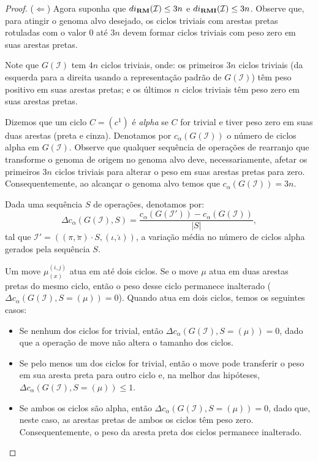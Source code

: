 \begin{proof}
($\Leftarrow$) Agora suponha que $di_{\textbf{RM}}(\mathcal{I}) \le 3n$ e $di_{\textbf{RMI}}(\mathcal{I}) \le 3n$. Observe que, para atingir o genoma alvo desejado, os ciclos triviais com arestas pretas rotuladas com o valor $0$ até $3n$ devem formar ciclos triviais com peso zero em suas arestas pretas.

Note que $G(\mathcal{I})$ tem $4n$ ciclos triviais, onde: os primeiros $3n$ ciclos triviais (da esquerda para a direita usando a representação padrão de $G(\mathcal{I})$) têm peso positivo em suas arestas pretas; e os últimos $n$ ciclos triviais têm peso zero em suas arestas pretas.

Dizemos que um ciclo $C=(c^1)$ é \emph{alpha} se $C$ for trivial e tiver peso zero em suas duas arestas (preta e cinza). Denotamos por $c_{\alpha}(G(\mathcal{I}))$ o número de ciclos alpha em $G(\mathcal{I})$. Observe que qualquer sequência de operações de rearranjo que transforme o genoma de origem no genoma alvo deve, necessariamente, afetar os primeiros $3n$ ciclos triviais para alterar o peso em suas arestas pretas para zero. Consequentemente, ao alcançar o genoma alvo temos que $c_{\alpha}(G(\mathcal{I})) = 3n$.

Dada uma sequência $S$ de operações, denotamos por: $$\Delta c_{\alpha}(G(\mathcal{I}), S) = \frac{c_{\alpha}(G(\mathcal{I'})) - c_{\alpha}(G(\mathcal{I}))}{|S|},$$ tal que $\mathcal{I'} = ((\pi,\breve\pi) \cdot S,(\iota,\breve\iota))$, a variação média no número de ciclos alpha gerados pela sequência $S$.

Um move $\mu_{(x)}^{(i,j)}$ atua em até dois ciclos. Se o move $\mu$ atua em duas arestas pretas do mesmo ciclo, então o peso desse ciclo permanece inalterado ($\Delta c_{\alpha}(G(\mathcal{I}), S=(\mu)) = 0$). Quando atua em dois ciclos, temos os seguintes casos:
\begin{itemize}
  \item Se nenhum dos ciclos for trivial, então $\Delta c_{\alpha}(G(\mathcal{I}), S=(\mu)) = 0$, dado que a operação de move não altera o tamanho dos ciclos.
  \item Se pelo menos um dos ciclos for trivial, então o move pode transferir o peso em sua aresta preta para outro ciclo e, na melhor das hipóteses, $\Delta c_{\alpha}(G(\mathcal{I}), S=(\mu)) \le 1$.
  \item Se ambos os ciclos são alpha, então $\Delta c_{\alpha}(G(\mathcal{I}), S=(\mu)) = 0$, dado que, neste caso, as arestas pretas de ambos os ciclos têm peso zero. Consequentemente, o peso da aresta preta dos ciclos permanece inalterado.
\end{itemize}


\end{proof}
